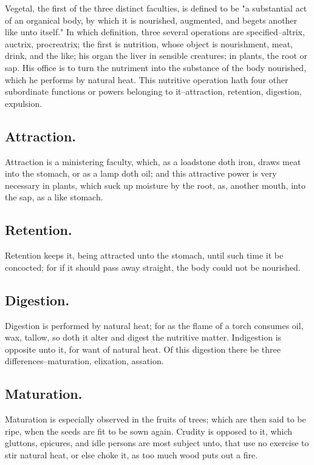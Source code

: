 Vegetal, the first of the three distinct faculties, is defined to be "a
substantial act of an organical body, by which it is nourished, augmented, and
begets another like unto itself." In which definition, three several operations
are specified--altrix, auctrix, procreatrix; the first is
nutrition, whose object is nourishment, meat, drink, and
the like; his organ the liver in sensible creatures; in plants, the root or
sap. His office is to turn the nutriment into the substance of the body
nourished, which he performs by natural heat. This nutritive operation hath
four other subordinate functions or powers belonging to it--attraction,
retention, digestion, expulsion.

\subsection{Attraction.}

Attraction is a ministering faculty, which, as a loadstone
doth iron, draws meat into the stomach, or as a lamp doth oil; and this
attractive power is very necessary in plants, which suck up moisture by the
root, as, another mouth, into the sap, as a like stomach.

\subsection{Retention.}

Retention keeps it, being attracted unto the stomach, until such time it be
concocted; for if it should pass away straight, the body could not be
nourished.

\subsection{Digestion.}

Digestion is performed by natural heat; for as the flame of a torch consumes
oil, wax, tallow, so doth it alter and digest the nutritive matter. Indigestion
is opposite unto it, for want of natural heat. Of this digestion there be three
differences--maturation, elixation, assation.

\subsection{Maturation.}

Maturation is especially observed in the fruits of trees; which are then said
to be ripe, when the seeds are fit to be sown again. Crudity is opposed to it,
which gluttons, epicures, and idle persons are most subject unto, that use no
exercise to stir natural heat, or else choke it, as too much wood puts out a
fire.

